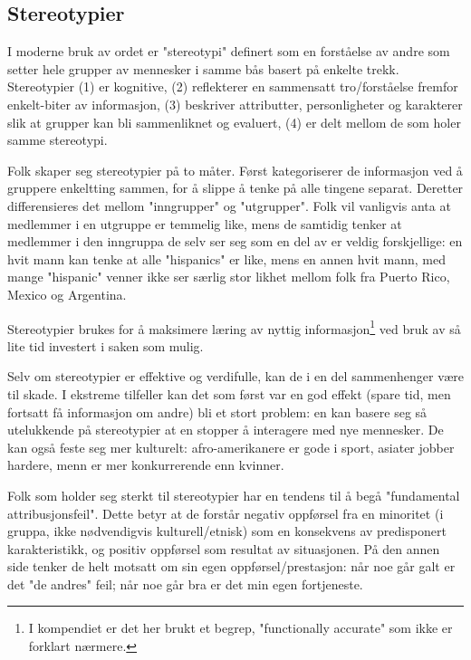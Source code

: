 \documentclass[11pt]{article}
\begin{document}
		\subsection{Stereotypier}
			I moderne bruk av ordet er "stereotypi" definert som en forståelse av andre som setter hele grupper av mennesker i samme bås basert på enkelte trekk. Stereotypier (1) er kognitive, (2) reflekterer en sammensatt tro/forståelse fremfor enkelt-biter av informasjon, (3) beskriver attributter, personligheter og karakterer slik at grupper kan bli sammenliknet og evaluert, (4) er delt mellom de som holer samme stereotypi.
			
			Folk skaper seg stereotypier på to måter. Først kategoriserer de informasjon ved å gruppere enkeltting sammen, for å slippe å tenke på alle tingene separat. Deretter differensieres det mellom "inngrupper" og "utgrupper". Folk vil vanligvis anta at medlemmer i en utgruppe er temmelig like, mens de samtidig tenker at medlemmer i den inngruppa de selv ser seg som en del av er veldig forskjellige: en hvit mann kan tenke at alle "hispanics" er like, mens en annen hvit mann, med mange "hispanic" venner ikke ser særlig stor likhet mellom folk fra Puerto Rico, Mexico og Argentina. 
			
			Stereotypier brukes for å maksimere læring av nyttig informasjon\footnote{I kompendiet er det her brukt et begrep, "functionally accurate" som ikke er forklart nærmere.} ved bruk av så lite tid investert i saken som mulig.
			
			Selv om stereotypier er effektive og verdifulle, kan de i en del sammenhenger være til skade. I ekstreme tilfeller kan det som først var en god effekt (spare tid, men fortsatt få informasjon om andre) bli et stort problem: en kan basere seg så utelukkende på stereotypier at en stopper å interagere med nye mennesker. De kan også feste seg mer kulturelt: afro-amerikanere er gode i sport, asiater jobber hardere, menn er mer konkurrerende enn kvinner. 
			
			Folk som holder seg sterkt til stereotypier har en tendens til å begå "fundamental attribusjonsfeil". Dette betyr at de forstår negativ oppførsel fra en minoritet (i gruppa, ikke nødvendigvis kulturell/etnisk) som en konsekvens av predisponert karakteristikk, og positiv oppførsel som resultat av situasjonen. På den annen side tenker de helt motsatt om sin egen oppførsel/prestasjon: når noe går galt er det "de andres" feil; når noe går bra er det min egen fortjeneste.
			
\end{document}
